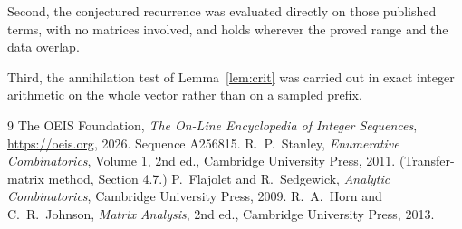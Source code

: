 \documentclass[11pt,a4paper]{article}
\theoremstyle{plain}
\theoremstyle{definition}
\begin{document}
Second, the conjectured recurrence was evaluated directly on those published terms, with no
matrices involved, and holds wherever the proved range and the data overlap.

Third, the annihilation test of Lemma~\ref{lem:crit} was carried out in exact integer
arithmetic on the whole vector rather than on a sampled prefix.

\begin{thebibliography}{9}
 The OEIS Foundation, \emph{The On-Line Encyclopedia of Integer
Sequences}, \url{https://oeis.org}, 2026. Sequence A256815.
 R.~P.~Stanley, \emph{Enumerative Combinatorics}, Volume 1, 2nd ed.,
Cambridge University Press, 2011. (Transfer-matrix method, Section 4.7.)
 P.~Flajolet and R.~Sedgewick, \emph{Analytic Combinatorics}, Cambridge
University Press, 2009.
 R.~A.~Horn and C.~R.~Johnson, \emph{Matrix Analysis}, 2nd ed., Cambridge
University Press, 2013.
\end{thebibliography}
\end{document}
